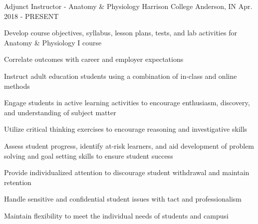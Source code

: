 

\begin{cventries}

  \cventry
    {Adjunct Instructor - Anatomy \& Physiology}
    {Harrison College}
    {Anderson, IN}
    {Apr. 2018 - PRESENT}
    {
      \begin{cvitems}
      \item {Develop course objectives, syllabus, lesson plans, tests, and lab activities for Anatomy \& Physiology I course} 
      \item {Correlate outcomes with career and employer expectations}
        \item {Instruct adult education students using a combination of in-class and online methods}
        \item {Engage students in active learning activities to encourage enthusiasm, discovery, and understanding of subject matter}
      \item {Utilize critical thinking exercises to encourage reasoning and investigative skills}
      \item {Assess student progress, identify at-risk learners, and aid development of problem solving and goal setting skills to ensure student success}
      \item {Provide individualized attention to discourage student withdrawal and maintain retention}
      \item {Handle sensitive and confidential student issues with tact and professionalism}
      \item {Maintain flexibility to meet the individual needs of students and campus}i
  \end{cvitems}
    }


\end{cventries}
